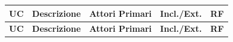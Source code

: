 \documentclass[12pt, a4paper]{article}
\begin{document}
\begin{longtable}{|
    >{\centering\arraybackslash}m{}  %
    |>{\raggedright\arraybackslash}m{} %
    |>{\centering\arraybackslash}m{}  %
    |>{\centering\arraybackslash}m{}  %
    |>{\centering\arraybackslash}m{}  %
|}
\hline
\textbf{UC} 
  & \textbf{Descrizione} 
  & \textbf{Attori Primari} 
  & \textbf{Incl./Ext.} 
  & \textbf{RF} \\
\hline
\endfirsthead

\hline
\textbf{UC} 
  & \textbf{Descrizione} 
  & \textbf{Attori Primari} 
  & \textbf{Incl./Ext.} 
  & \textbf{RF} \\
\hline
\endhead


\end{longtable}
\end{document}
